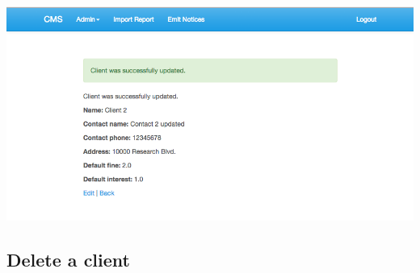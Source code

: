 \begin{itemize}
    \includegraphics[scale=0.25]{./images/ss/client/edit/5.png}
\end{itemize}

\subsection*{Delete a client}

